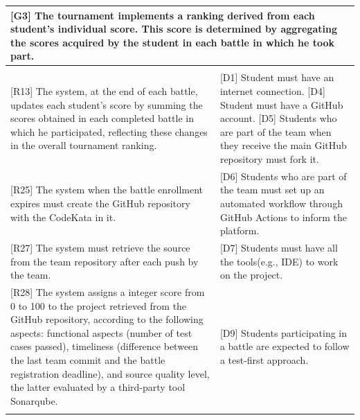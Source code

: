 \begin{tabular}{|p{7.5cm}|p{7.5cm}|}
\hline
\multicolumn{2}{|p{15cm}|}{\textbf{[G3] The tournament implements a ranking derived from each student's individual score. This score is determined by aggregating the scores acquired by the student in each battle in which he took part.}}\\
\hline
\vspace{2pt}&\vspace{2pt}\\
{[R13] The system, at the end of each battle, updates each student’s score by summing the scores obtained in each completed battle in which he participated, reflecting these changes in the overall tournament ranking.}
& 
{[D1] Student must have an internet connection.}
\newline
{[D4] Student must have a GitHub account.}
\newline
{[D5] Students who are part of the team when they receive the main GitHub repository must fork it.}
\\

{[R25] The system when the battle enrollment expires must create the GitHub repository with the CodeKata in it.}
& 
{[D6] Students who are part of the team must set up an automated workflow through GitHub Actions to inform the platform.}
\\

{[R27] The system must retrieve the source from the team repository after each push by the team.}
& 
{[D7] Students must have all the tools(e.g., IDE) to work on the project.}
\\

{[R28] The system assigns a integer score from 0 to 100 to the project retrieved from the GitHub repository, according to the following aspects: functional aspects (number of test cases passed), timeliness (difference between the last team commit and the battle registration deadline), and source quality level, the latter evaluated by a third-party tool Sonarqube.}
& 
{[D9] Students participating in a battle are expected to follow a test-first approach.}
\\

\vspace{2pt}&\vspace{2pt}\\
\hline
\end{tabular}









